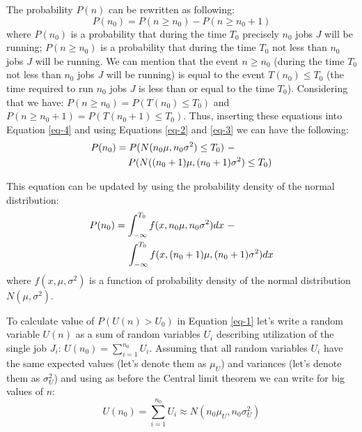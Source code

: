 The probability $P(n)$ can be rewritten as following:
\begin{equation}
    \label{eq-4}
    P(n_0) = P(n \geq n_0) - P(n \geq n_0 + 1)
\end{equation}
where $P(n_0)$ is a probability that during the time $T_0$ precisely $n_0$ jobs $J$ will be running; $P(n \geq n_0)$ is a probability that during the time $T_0$ not less than $n_0$ jobs $J$ will be running. We can mention that the event $n \geq n_0$ (during the time $T_0$ not less than $n_0$ jobs $J$ will be running) is equal to the event $T(n_0) \leq T_0$ (the time required to run $n_0$ jobs $J$ is less than or equal to the time $T_0$). Considering that we have: $P(n \geq n_0) = P(T(n_0) \leq T_0)$ and $P(n \geq n_0 + 1) = P(T(n_0 + 1) \leq T_0)$. Thus, inserting these equations into Equation \ref{eq-4} and using Equations \ref{eq-2} and \ref{eq-3} we can have the following:
\begin{equation}
    \label{eq-5}
    \begin{multlined}
    P(n_0) = P(N(n_0\mu, n_0\sigma^2) \leq T_0) \  - \\
             \shoveleft[1cm]{P(N((n_0 + 1)\mu, (n_0 + 1)\sigma^2) \leq T_0)}
    \end{multlined} 
\end{equation}

This equation can be updated by using the probability density of the normal distribution:
\begin{equation}
    \label{eq-6}
    \begin{multlined}
    P(n_0) = \int_{-\infty}^{T_0}f(x, n_0\mu, n_0\sigma^2)dx \  - \\
             \shoveleft[1cm]{\int_{-\infty}^{T_0}f(x, (n_0 + 1)\mu, (n_0 + 1)\sigma^2)dx}
    \end{multlined}
\end{equation}
where $f(x, \mu, \sigma^2)$ is a function of probability density of the normal distribution $N(\mu, \sigma^2)$.

To calculate value of $P(U(n) > U_0)$ in Equation \ref{eq-1} let's write a random variable $U(n)$ as a sum of random variables $U_{i}$ describing utilization of the single job $J_{i}$: $U(n_0) = \sum_{i=1}^{n_0}U_{i}$. Assuming that all random variables $U_{i}$ have the same expected values (let's denote them as $\mu_{U}$) and variances (let's denote them as $\sigma_{U}^2$) and using as before the Central limit theorem we can write for big values of $n$:
\begin{equation}
    \label{eq-7}
    U(n_0) = \sum_{i=1}^{n_0}U_{i} \approx N(n_0\mu_{U}, n_0\sigma_{U}^2)
\end{equation}

